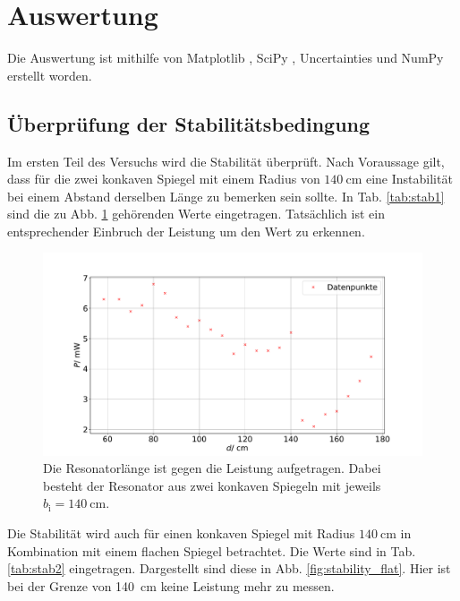 \section{Auswertung}
\label{sec:Auswertung}
Die Auswertung ist mithilfe von Matplotlib \cite{matplotlib}, SciPy \cite{scipy}, Uncertainties \cite{uncertainties} und NumPy \cite{numpy} erstellt worden.

\subsection{Überprüfung der Stabilitätsbedingung}

Im ersten Teil des Versuchs wird die Stabilität überprüft. Nach Voraussage gilt, dass für die zwei konkaven Spiegel mit einem Radius von $\SI{140}{\centi\meter}$ eine Instabilität bei einem Abstand derselben Länge zu bemerken sein sollte. 
In Tab. \ref{tab:stab1} sind die zu Abb. \ref{fig:stability140} gehörenden Werte eingetragen.
Tatsächlich ist ein entsprechender Einbruch der Leistung um den Wert zu erkennen. %



\begin{figure}
    \centering
    \includegraphics[width=\textwidth]{plots/stability140.pdf}
    \caption{Die Resonatorlänge ist gegen die Leistung aufgetragen. Dabei besteht der Resonator aus zwei konkaven Spiegeln mit jeweils $b_\text{i} = \SI{140}{\centi\meter}$.}
    \label{fig:stability140}
\end{figure} 

Die Stabilität wird auch für einen konkaven Spiegel mit Radius $\SI{140}{\centi\meter}$ in Kombination mit einem flachen Spiegel betrachtet. Die Werte sind in Tab. \ref{tab:stab2} eingetragen. Dargestellt sind diese in Abb. \ref{fig:stability_flat}.
Hier ist bei der Grenze von \SI{140}{\centi\meter} keine Leistung mehr zu messen.

